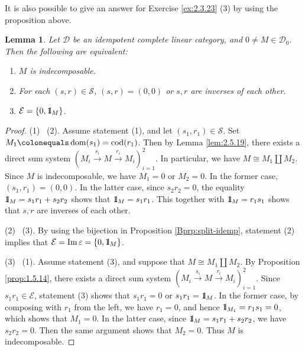 \documentclass{surv-l}
\numberwithin{equation}{chapter}
\numberwithin{figure}{chapter}
\theoremstyle{plain}
\newtheorem{lem}[thm]{Lemma}
\theoremstyle{definition}
\theoremstyle{remark}
\newcommand{\id}{1\kern-.25em{\text{{\rm l}}}}
\DeclareMathOperator{\dom}{dom}
\DeclareMathOperator{\cod}{cod}
\begin{document}
It is also possible to give an answer for Exercise \ref{ex:2.3.23} (3)
by using the proposition above.

\begin{lem}
Let ${\mathcal{D}}$ be an idempotent complete linear category, and $0 \ne M \in {\mathcal{D}}_0$.
Then the following are equivalent:

\begin{enumerate}
\item
$M$ is indecomposable.
\item
For each $(s,r) \in \mathcal{S}$, $(s,r) = (0,0)$ or $s,r$ are inverses of each other.
\item
$\mathcal{E} = \{0, \id_M\}$.
\end{enumerate}
\end{lem}

\begin{proof}
(1) \text{$\Rightarrow$}\  (2).
Assume statement (1), and let $(s_1,r_1) \in \mathcal{S}$.
Set $M_1\colonequals  \dom(s_1) = \cod(r_1)$.
Then by Lemma \ref{lem:2.5.19}, there exists a direct sum system
$(M_i \xrightarrow{s_i} M \xrightarrow{r_i} M_i)_{i=1}^2$.
In particular, we have $M \cong M_1 \amalg M_2$.
Since $M$ is indecomposable, we have $M_1 = 0$ or $M_2 = 0$.
In the former case, $(s_1,r_1) = (0,0)$.
In the latter case, since $s_2r_2 = 0$, the equality $\id_M = s_1r_1 + s_2r_2$ shows that
$\id_M = s_1 r_1$. This together with $\id_M = r_1s_1$ shows that
$s, r$ are inverses of each other.

(2) \text{$\Rightarrow$}\  (3).
By using the bijection in Proposition \ref{Bprp:split-idemp},
statement (2) implies that
$\mathcal{E} = \operatorname{Im} \varepsilon = \{0, \id_M\}$.

(3) \text{$\Rightarrow$}\  (1).
Assume statement (3), and suppose that $M \cong M_1 \amalg M_2$.
By Proposition \ref{prop:1.5.14}, there exists a direct sum system
$(M_i \xrightarrow{s_i} M \xrightarrow{r_i} M_i)_{i=1}^2$.
Since $s_1r_1 \in \mathcal{E}$, statement (3) shows that
$s_1r_1 = 0$ or $s_1r_1 = \id_M$.
In the former case, by composing with $r_1$ from the left,
we have $r_1=0$, and hence $\id_{M_1} = r_1s_1 = 0$, which shows that
$M_1 = 0$.
In the latter case,
since $\id_M = s_1r_1 + s_2r_2$, we have $s_2r_2 = 0$.
Then the same argument shows that $M_2 = 0$.
Thus $M$ is indecomposable.
\pagebreak\end{proof}
\end{document}
